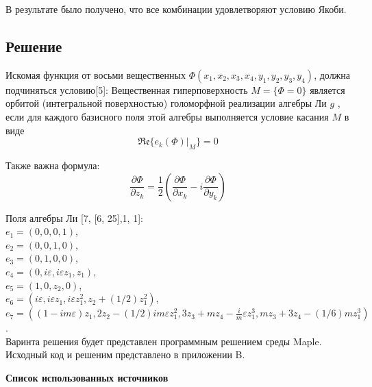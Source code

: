 \href{\href{}{}}{}\documentclass[14pt]{extarticle} %
\begin{document}
В результате было получено, что все комбинации удовлетворяют условию Якоби.

\subsection{Решение}

Искомая функция от восьми вещественных \(\Phi(x_1,x_2,x_3,x_4,y_1,y_2,y_3,y_4)\), должна подчиняться условию[5]:\newline
Вещественная гиперповерхность
\(M=\lbrace{\Phi=0}\rbrace\) является орбитой
(интегральной поверхностью) голоморфной реализации алгебры Ли \(g\) ,
если для каждого базисного поля этой алгебры выполняется условие
касания \(M\) в виде
\[
\mathfrak{Re}\lbrace{e_k(\Phi)|_M\rbrace}=0
\]\newline

Также важна формула:
\[
\frac{\partial\Phi}{\partial z_k}=\frac{1}{2}(\frac{\partial\Phi}{\partial x_k}- i\frac{\partial\Phi}{\partial y_k})
\]\newline

Поля алгебры Ли  [7, [6, 25],1, 1]: \\

$e_1 = (0, 0, 0, 1)$, \\

$e_2 = (0, 0, 1, 0)$, \\

$e_3 = (0, 1, 0, 0)$, \\

$e_4 = (0, i \varepsilon, i \varepsilon z_1, z_1)$, \\

$e_5 = (1, 0, z_2, 0)$, \\

$e_6 = \left( i \varepsilon, i \varepsilon z_1, i \varepsilon z_1^2, z_2 + (1/2)z_1^2 \right)$, \\

$e_7 = \left( (1 - i m \varepsilon) z_1, 2 z_2 - (1/2) i m \varepsilon z_1^2, 3 z_3 + m z_4 - \frac{i}{m} \varepsilon z_1^3, m z_3 + 3 z_4 - (1/6) m z_1^3 \right)$.\\

Варинта решения будет представлен программным решением среды Maple. Исходный код и решеним представлено в приложении B.

\newpage
{} %
\begin{center}
    \Large \textbf{Список использованных источников}
\end{center}
\end{document}
